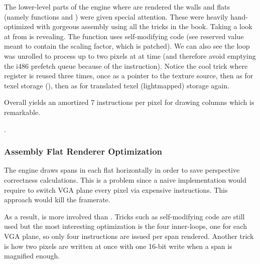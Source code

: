The lower-level parts of the engine where are rendered the walls and flats (namely functions  and ) were given special attention. These were heavily hand-optimized with gorgeous assembly using all the tricks in the book. Taking a look at  from  is revealing. The function uses self-modifying code (see reserved value  meant to contain the scaling factor, which is patched).
We can also see the loop was unrolled to process up to two pixels at at time (and therefore avoid emptying the i486 prefetch queue because of the  instruction). Notice the cool trick where register  is reused three times, once as a pointer to the texture source, then as  for texel storage (), then as  for translated texel (lightmapped) storage again.\\ 
\par
Overall  yields an amortized 7 instructions per pixel for drawing columns which is remarkable.\\
\par
{}.









\vspace{-28pt}
\subsubsection{Assembly Flat Renderer Optimization}
The engine draws spans in each flat horizontally in order to save perspective correctness calculations. This is a problem since a naive implementation would require to switch VGA plane every pixel via expensive  instructions. This approach would kill the framerate.\\
\par
As a result,  is more involved than . Tricks such as self-modifying code are still used but the most interesting optimization is the four inner-loops, one for each VGA plane, so only four  instructions are issued per span rendered. Another trick is how two pixels are written at once with one 16-bit write when a span is magnified enough.\\

